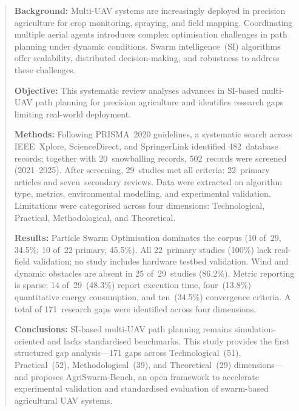 \documentclass[review,3p]{elsarticle}
\begin{document}
\begin{frontmatter}
\address[1]{Instituto Tecnológico de Chihuahua II, Tecnológico Nacional de México, Chihuahua, México}
\address[2]{Universidad Politécnica de Chihuahua, Chihuahua, México}
\address[3]{Facultad de Ingeniería, Universidad Autónoma de Chihuahua, Chihuahua, México}
\address[4]{Departamento de Ingeniería Mecánica, Universidad de Zaragoza, Zaragoza, España}


\begin{abstract}
\textbf{Background:} Multi-UAV systems are increasingly deployed in precision
agriculture for crop monitoring, spraying, and field mapping. Coordinating
multiple aerial agents introduces complex optimisation challenges in path
planning under dynamic conditions. Swarm intelligence~(SI) algorithms offer
scalability, distributed decision-making, and robustness to address these
challenges.

\textbf{Objective:} This systematic review analyses advances in SI-based
multi-UAV path planning for precision agriculture and identifies research gaps
limiting real-world deployment.

\textbf{Methods:} Following PRISMA~2020 guidelines, a systematic search across
IEEE~Xplore, ScienceDirect, and SpringerLink identified 482~database records;
together with 20~snowballing records, 502~records were screened (2021--2025).
After screening, 29~studies met all criteria: 22~primary articles and
seven~secondary reviews. Data were extracted on algorithm type, metrics,
environmental modelling, and experimental validation. Limitations were
categorised across four dimensions: Technological, Practical, Methodological,
and Theoretical.

\textbf{Results:} Particle Swarm Optimisation dominates the corpus
(10 of~29, 34.5\%; 10 of~22 primary, 45.5\%). All 22~primary studies
(100\%) lack real-field validation; no study includes hardware testbed
validation. Wind and dynamic obstacles are absent in 25 of~29~studies
(86.2\%). Metric reporting is sparse: 14 of~29~(48.3\%) report execution
time, four~(13.8\%) quantitative energy consumption, and ten~(34.5\%)
convergence criteria. A total of 171~research gaps were identified across
four dimensions.

\textbf{Conclusions:} SI-based multi-UAV path planning remains
simulation-oriented and lacks standardised benchmarks. This study provides
the first structured gap analysis---171 gaps across Technological~(51),
Practical~(52), Methodological~(39), and Theoretical~(29)
dimensions---and proposes AgriSwarm-Bench, an open framework to accelerate
experimental validation and standardised evaluation of swarm-based
agricultural UAV systems.
\end{abstract}


\end{frontmatter}
\end{document}
